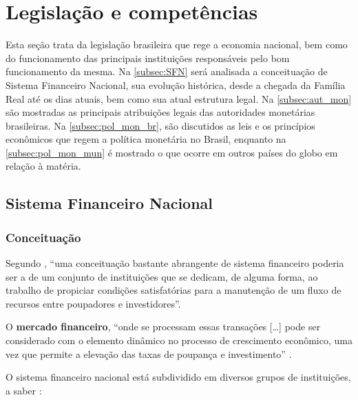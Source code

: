\documentclass[
	10pt,				%
	openright,			%
	twoside,			%
	a5paper,			%
	english,			%
	french,				%
	spanish,			%
	brazil				%
	]{abntex2}
\begin{document}
\section{Legislação e
competências}\label{legislauxe7uxe3o-e-competuxeancias}

Esta seção trata da legislação brasileira que rege a economia nacional,
bem como do funcionamento das principais instituições responsáveis pelo
bom funcionamento da mesma. Na \autoref{subsec:SFN} será analisada a
conceituação de Sistema Financeiro Nacional, sua evolução histórica,
desde a chegada da Família Real até os dias atuais, bem como sua atual
estrutura legal. Na \autoref{subsec:aut_mon} são mostradas as principais
atribuições legais das autoridades monetárias brasileiras. Na
\autoref{subsec:pol_mon_br}, são discutidos as leis e os princípios
econômicos que regem a política monetária no Brasil, enquanto na
\autoref{subsec:pol_mon_mun} é mostrado o que ocorre em outros países do
globo em relação à matéria.

\subsection{Sistema Financeiro Nacional}\label{subsec:SFN}

\subsubsection{Conceituação}\label{conceituauxe7uxe3o}

Segundo , ``uma conceituação bastante
abrangente de sistema financeiro poderia ser a de um conjunto de
instituições que se dedicam, de alguma forma, ao trabalho de propiciar
condições satisfatórias para a manutenção de um fluxo de recursos entre
poupadores e investidores''.

O \textbf{mercado financeiro}, ``onde se processam essas transações
{[}\ldots{}{]} pode ser considerado com o elemento dinâmico no processo
de crescimento econômico, uma vez que permite a elevação das taxas de
poupança e investimento'' \cite[p.~16]{fortuna2015}.

O sistema financeiro nacional está subdividido em diversos grupos de
instituições, a saber \cite[p.~18]{fortuna2015}:
\end{document}
